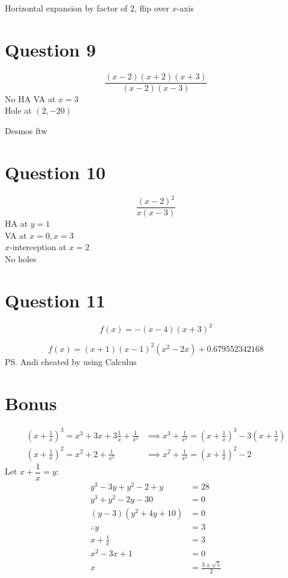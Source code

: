 \documentclass{article}
\begin{document}
\begin{custom-big}[Part c]
Horizontal expansion by factor of 2, flip over $x$-axis
\end{custom-big}

\pagebreak
\section{Question 9}
\begin{custom-big}[Part a]
\[\frac{(x-2)(x+2)(x+3)}{(x-2)(x-3)}\]
No HA
VA at $x=3$\\
Hole at $(2,-20)$
\end{custom-big}

\begin{custom-big}[Part b]
Desmos ftw
\end{custom-big}


\section{Question 10}
\begin{custom-big}[Solution]
\[\frac{(x-2)^2}{x(x-3)}\]
HA at $y=1$\\
VA at $x=0,x=3$\\
$x$-interception at $x=2$\\
No holes
\end{custom-big}


\section{Question 11}
\begin{custom-big}[Part a]
\[f(x)=-(x-4)(x+3)^3\]
\end{custom-big}

\begin{custom-big}[Part b]
\[f(x)=\left(x+1\right)\left(x-1\right)^{2}\left(x^{2}-2x\right)+0.679552342168\]
PS. Andi cheated by using Calculus
\end{custom-big}


\section{Bonus}
\begin{custom-big}[Solution]
\begin{align*}
    \left(x+\frac 1x\right)^3=x^3+3x+3\frac 1x+\frac{1}{x^3}&\implies x^3+\frac{1}{x^3}=\left(x+\frac 1x\right)^3-3\left(x+\frac 1x\right)\\
    \left(x+\frac 1x\right)^2=x^2+2+\frac{1}{x^2}&\implies x^2+\frac{1}{x^2}=\left(x+\frac 1x\right)^2-2
\end{align*}
Let $x+\dfrac 1x=y$:
\begin{align*}
    y^3-3y+y^2-2+y&=28\\
    y^3+y^2-2y-30&=0\\
    (y-3)(y^2+4y+10)&=0\\
    \therefore y&=3\\
    x+\frac 1x&=3\\
    x^2-3x+1&=0\\
    x&=\frac{3\pm\sqrt 5}{2}
\end{align*}
\end{custom-big}
\end{document}
